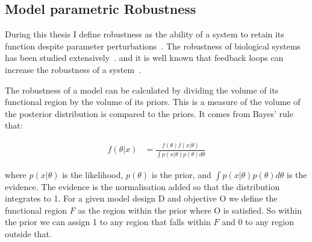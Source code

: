 \subsection{Model parametric Robustness}
\label{sec:rob_back}
During this thesis I define robustness as the ability of a system to retain its function despite parameter perturbations~\autocite{Stelling:2004wo}. The robustness of biological systems has been studied extensively~\autocite{Barkai:1997cd, Stelling:2004wo, Prill:2005fq, Kim:2006uk, Kitano:2007cp, Hafner:2009ct, Shinar:2010dd, ZamoraSillero:2011jw, Woods:2015vu}. and it is well known that feedback loops can increase the robustness of a system~\autocite{Becskei:2000ft,	 Doyle:2005ul}.

The robustness of a model can be calculated by dividing the volume of its functional region by the volume of its priors. This is a measure of the volume of the posterior distribution is compared to the priors. It comes from Bayes' rule that:

\begin{align}
	f(\theta|x) &= \frac{f(\theta)f(x|\theta)}{\int p(x|\theta)p(\theta)d\theta}
\end{align}

\noindent where $p(x|\theta)$ is the likelihood, $p(\theta)$ is the prior, and $\displaystyle \int p(x|\theta)p(\theta)d\theta$ is the evidence. The evidence is the normalisation  added so that the distribution integrates to 1. For a given model design D and objective O we define the functional region $F$ as the region within the prior where O is satisfied. So within the prior we can assign 1 to any region that falls within $F$ and 0 to any region outside that. 

